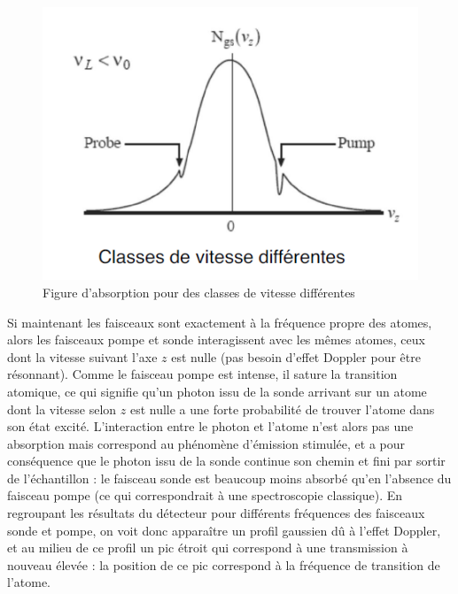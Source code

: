 \begin{figure}[htp]
    \centering
    \includegraphics[scale=1.0]{Images2/Vitesse2.PNG}
    \caption{Figure d'absorption pour des classes de vitesse différentes}
\label{fig:vit2}
\end{figure}

Si maintenant les faisceaux sont exactement à la fréquence propre des atomes, alors les faisceaux pompe et sonde interagissent avec les mêmes atomes, ceux dont la vitesse suivant l'axe $z$ est nulle (pas besoin d'effet Doppler pour être résonnant). Comme le faisceau pompe est intense, il sature la transition atomique, ce qui signifie qu'un photon issu de la sonde arrivant sur un atome dont la vitesse selon $z$ est nulle a une forte probabilité de trouver l'atome dans son état excité. L'interaction entre le photon et l'atome n'est alors pas une absorption mais correspond au phénomène d'émission stimulée, et a pour conséquence que le photon issu de la sonde continue son chemin et fini par sortir de l'échantillon : le faisceau sonde est beaucoup moins absorbé qu'en l'absence du faisceau pompe (ce qui correspondrait à une spectroscopie classique). En regroupant les résultats du détecteur pour différents fréquences des faisceaux sonde et pompe, on voit donc apparaître un profil gaussien dû à l'effet Doppler, et au milieu de ce profil un pic étroit qui correspond à une transmission à nouveau élevée : la position de ce pic correspond à la fréquence de transition de l'atome.

